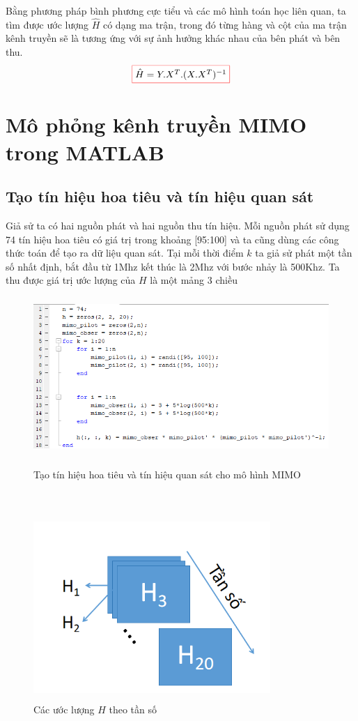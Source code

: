 \documentclass{article}
\begin{document}
Bằng phương pháp bình phương cực tiểu và các mô hình toán học liên quan, ta tìm được ước lượng $\hat{H}$ có dạng ma trận, trong đó từng hàng và cột của ma trận kênh truyền sẽ là tương ứng với sự ảnh hưởng khác nhau của bên phát và bên thu.
$$\fcolorbox{red}{white}{$\hat{H} = Y.X^T.(X.X^T)^{-1}$}$$
\section{Mô phỏng kênh truyền MIMO trong MATLAB}
\subsection{Tạo tín hiệu hoa tiêu và tín hiệu quan sát}
Giả sử ta có hai nguồn phát và hai nguồn thu tín hiệu. Mỗi nguồn phát sử dụng 74 tín hiệu hoa tiêu có giá trị trong khoảng [95:100] và ta cũng dùng các công thức toán để tạo ra dữ liệu quan sát. Tại mỗi thời điểm $k$ ta giả sử phát một tần số nhất định, bắt đầu từ 1Mhz kết thúc là 2Mhz với bước nhảy là 500Khz. Ta thu được giá trị ước lượng của $H$ là một mảng 3 chiều

\begin{figure}[h!]
    \centering
      \includegraphics[width=14cm, height =6cm]{photo/8.1.1.png}\\
    \caption{Tạo tín hiệu hoa tiêu và tín hiệu quan sát cho mô hình MIMO}
    \label{Hình 26}
\end{figure}\\
\begin{figure}[h!]
    \centering
    \includegraphics[width=9cm, height =7cm]{photo/8.1.2.png}
    \caption{Các ước lượng $H$ theo tần số}
    \label{Hình 27}
\end{figure}
\end{document}
